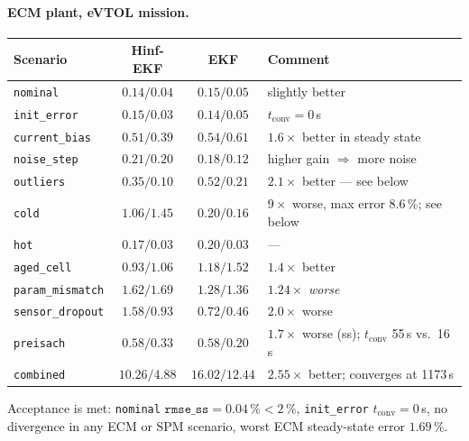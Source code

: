 \paragraph{ECM plant, eVTOL mission.}
\begin{center}\small
\begin{tabular}{@{}lccl@{}}
\toprule
Scenario & Hinf-EKF & EKF & Comment\\
\midrule
\texttt{nominal}        & $\mathbf{0.14/0.04}$ & $0.15/0.05$ & slightly better \\
\texttt{init\_error}    & $0.15/\mathbf{0.03}$ & $0.14/0.05$ & $t_\mathrm{conv}=0$\,s\\
\texttt{current\_bias}  & $0.51/\mathbf{0.39}$ & $0.54/0.61$ & $1.6\times$ better in steady state\\
\texttt{noise\_step}    & $0.21/0.20$ & $0.18/0.12$ & higher gain $\Rightarrow$ more noise\\
\texttt{outliers}       & $\mathbf{0.35/0.10}$ & $0.52/0.21$ & $2.1\times$ better --- see below\\
\texttt{cold}           & $1.06/1.45$ & $0.20/0.16$ & $9\times$ worse, max error $8.6\,\%$; see below\\
\texttt{hot}            & $0.17/0.03$ & $0.20/0.03$ & --- \\
\texttt{aged\_cell}     & $\mathbf{0.93/1.06}$ & $1.18/1.52$ & $1.4\times$ better\\
\texttt{param\_mismatch}& $1.62/1.69$ & $1.28/1.36$ & $1.24\times$ \emph{worse}\\
\texttt{sensor\_dropout}& $1.58/0.93$ & $0.72/0.46$ & $2.0\times$ worse\\
\texttt{preisach}       & $0.58/0.33$ & $0.58/0.20$ & $1.7\times$ worse (ss); $t_\mathrm{conv}$ 55\,s vs.\ 16\,s\\
\texttt{combined}       & $\mathbf{10.26/4.88}$ & $16.02/12.44$ & $\mathbf{2.55\times}$ better; converges at 1173\,s\\
\bottomrule
\end{tabular}
\end{center}
Acceptance is met: \texttt{nominal} $\texttt{rmse\_ss}=0.04\,\%<2\,\%$, \texttt{init\_error}
$t_\mathrm{conv}=0$\,s, no divergence in any ECM or SPM scenario, worst ECM steady-state error
$1.69\,\%$.


